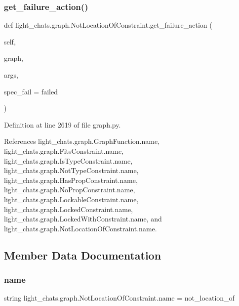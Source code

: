 \subsubsection{\texorpdfstring{get\+\_\+failure\+\_\+action()}{get\_failure\_action()}}
{\footnotesize\ttfamily def light\+\_\+chats.\+graph.\+Not\+Location\+Of\+Constraint.\+get\+\_\+failure\+\_\+action (\begin{DoxyParamCaption}\item[{}]{self,  }\item[{}]{graph,  }\item[{}]{args,  }\item[{}]{spec\+\_\+fail = {\ttfamily \textquotesingle{}failed\textquotesingle{}} }\end{DoxyParamCaption})}



Definition at line 2619 of file graph.\+py.



References light\+\_\+chats.\+graph.\+Graph\+Function.\+name, light\+\_\+chats.\+graph.\+Fits\+Constraint.\+name, light\+\_\+chats.\+graph.\+Is\+Type\+Constraint.\+name, light\+\_\+chats.\+graph.\+Not\+Type\+Constraint.\+name, light\+\_\+chats.\+graph.\+Has\+Prop\+Constraint.\+name, light\+\_\+chats.\+graph.\+No\+Prop\+Constraint.\+name, light\+\_\+chats.\+graph.\+Lockable\+Constraint.\+name, light\+\_\+chats.\+graph.\+Locked\+Constraint.\+name, light\+\_\+chats.\+graph.\+Locked\+With\+Constraint.\+name, and light\+\_\+chats.\+graph.\+Not\+Location\+Of\+Constraint.\+name.



\subsection{Member Data Documentation}
\mbox{\label{classlight__chats_1_1graph_1_1NotLocationOfConstraint_a25a64327543d978ac8b81ae8be5624e8}} 
\subsubsection{\texorpdfstring{name}{name}}
{\footnotesize\ttfamily string light\+\_\+chats.\+graph.\+Not\+Location\+Of\+Constraint.\+name = \textquotesingle{}not\+\_\+location\+\_\+of\textquotesingle{}\hspace{0.3cm}{\ttfamily [static]}}




